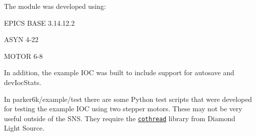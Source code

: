 The module was developed using: 
\begin{DoxyItemize}
\item EPICS BASE 3.14.12.2 
\item ASYN 4-\/22 
\item MOTOR 6-\/8 
\end{DoxyItemize}

In addition, the example IOC was built to include support for autosave and devIocStats.

In parker6k/example/test there are some Python test scripts that were developed for testing the example IOC using two stepper motors. These may not be very useful outside of the SNS. They require the \href{http://controls.diamond.ac.uk/downloads/python/cothread/}{\tt cothread} library from Diamond Light Source. 